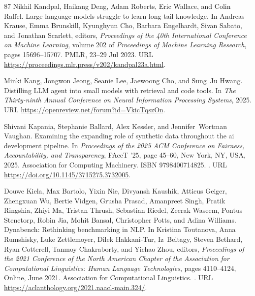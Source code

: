 \begin{thebibliography}{87}
Nikhil Kandpal, Haikang Deng, Adam Roberts, Eric Wallace, and Colin Raffel.
\newblock Large language models struggle to learn long-tail knowledge.
\newblock In Andreas Krause, Emma Brunskill, Kyunghyun Cho, Barbara Engelhardt, Sivan Sabato, and Jonathan Scarlett, editors, \emph{Proceedings of the 40th International Conference on Machine Learning}, volume 202 of \emph{Proceedings of Machine Learning Research}, pages 15696--15707. PMLR, 23--29 Jul 2023.
\newblock URL \url{https://proceedings.mlr.press/v202/kandpal23a.html}.

Minki Kang, Jongwon Jeong, Seanie Lee, Jaewoong Cho, and Sung~Ju Hwang.
\newblock Distilling {LLM} agent into small models with retrieval and code tools.
\newblock In \emph{The Thirty-ninth Annual Conference on Neural Information Processing Systems}, 2025.
\newblock URL \url{https://openreview.net/forum?id=VkicTqszOn}.

Shivani Kapania, Stephanie Ballard, Alex Kessler, and Jennifer~Wortman Vaughan.
\newblock Examining the expanding role of synthetic data throughout the ai development pipeline.
\newblock In \emph{Proceedings of the 2025 ACM Conference on Fairness, Accountability, and Transparency}, FAccT '25, page 45–60, New York, NY, USA, 2025. Association for Computing Machinery.
\newblock ISBN 9798400714825.
\newblock {}.
\newblock URL \url{https://doi.org/10.1145/3715275.3732005}.

Douwe Kiela, Max Bartolo, Yixin Nie, Divyansh Kaushik, Atticus Geiger, Zhengxuan Wu, Bertie Vidgen, Grusha Prasad, Amanpreet Singh, Pratik Ringshia, Zhiyi Ma, Tristan Thrush, Sebastian Riedel, Zeerak Waseem, Pontus Stenetorp, Robin Jia, Mohit Bansal, Christopher Potts, and Adina Williams.
\newblock Dynabench: Rethinking benchmarking in {NLP}.
\newblock In Kristina Toutanova, Anna Rumshisky, Luke Zettlemoyer, Dilek Hakkani-Tur, Iz~Beltagy, Steven Bethard, Ryan Cotterell, Tanmoy Chakraborty, and Yichao Zhou, editors, \emph{Proceedings of the 2021 Conference of the North American Chapter of the Association for Computational Linguistics: Human Language Technologies}, pages 4110--4124, Online, June 2021. Association for Computational Linguistics.
\newblock {}.
\newblock URL \url{https://aclanthology.org/2021.naacl-main.324/}.


\end{thebibliography}
